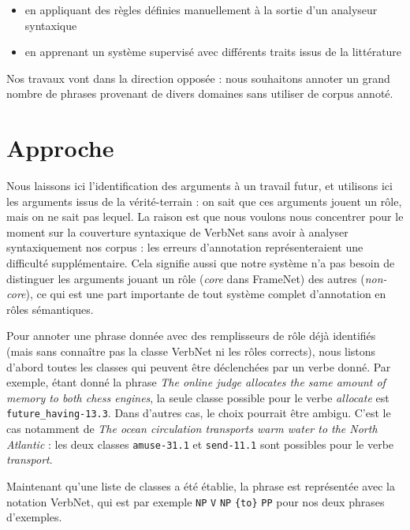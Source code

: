 \begin{itemize}

    \item en appliquant des règles définies manuellement à la sortie d'un
        analyseur syntaxique

    \item en apprenant un système supervisé avec différents traits issus de la
        littérature

\end{itemize}

Nos travaux vont dans la direction opposée : nous souhaitons annoter un grand
nombre de phrases provenant de divers domaines sans utiliser de corpus annoté.

\section{Approche}
\label{sec:domainsrl_approche}


Nous laissons ici l'identification des arguments à un travail futur, et
utilisons ici les arguments issus de la vérité-terrain : on sait que ces
arguments jouent un rôle, mais on ne sait pas lequel. La raison est que nous
voulons nous concentrer pour le moment sur la couverture syntaxique de VerbNet
sans avoir à analyser syntaxiquement nos corpus : les erreurs d'annotation
représenteraient une difficulté supplémentaire. Cela signifie aussi que notre
système n'a pas besoin de distinguer les arguments jouant un rôle (\emph{core}
dans FrameNet) des autres (\emph{non-core}), ce qui est une part importante de
tout système complet d'annotation en rôles sémantiques.

Pour annoter une phrase donnée avec des remplisseurs de rôle déjà identifiés
(mais sans connaître pas la classe VerbNet ni les rôles corrects), nous listons
d'abord toutes les classes qui peuvent être déclenchées par un verbe donné. Par
exemple, étant donné la phrase \emph{The online judge allocates the same amount
of memory to both chess engines}, la seule classe possible pour le verbe
\emph{allocate} est \texttt{future\_having-13.3}. Dans d'autres cas, le choix
pourrait être ambigu. C'est le cas notamment de \emph{The ocean circulation
transports warm water to the North Atlantic} : les deux classes
\texttt{amuse-31.1} et \texttt{send-11.1} sont possibles pour le verbe
\emph{transport}.

Maintenant qu'une liste de classes a été établie, la phrase est représentée
avec la notation VerbNet, qui est par exemple \texttt{NP} \texttt{V}
\texttt{NP} \texttt{\{to\}} \texttt{PP} pour nos deux phrases d'exemples.

